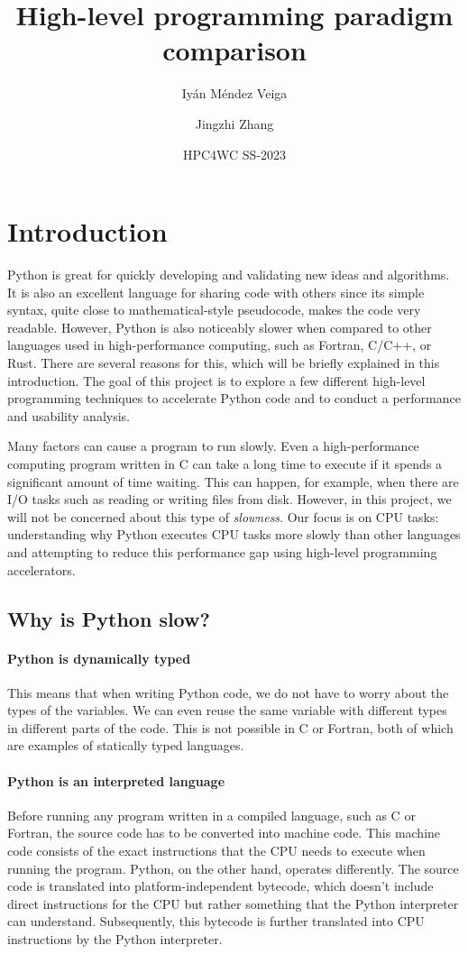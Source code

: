 \documentclass[12pt]{article}
\title{High-level programming paradigm comparison}
\author{Iyán Méndez Veiga \and Jingzhi Zhang}
\date{HPC4WC SS-2023}
\begin{document}
\maketitle
\tableofcontents

\section{Introduction}

Python is great for quickly developing and validating new ideas and algorithms. It is also an excellent language for sharing code with others since its simple syntax, quite close to mathematical-style pseudocode, makes the code very readable. However, Python is also noticeably slower when compared to other languages used in high-performance computing, such as Fortran, C/C++, or Rust. There are several reasons for this, which will be briefly explained in this introduction. The goal of this project is to explore a few different high-level programming techniques to accelerate Python code and to conduct a performance and usability analysis.

Many factors can cause a program to run slowly. Even a high-performance computing program written in C can take a long time to execute if it spends a significant amount of time waiting. This can happen, for example, when there are I/O tasks such as reading or writing files from disk. However, in this project, we will not be concerned about this type of \emph{slowness}. Our focus is on CPU tasks: understanding why Python executes CPU tasks more slowly than other languages and attempting to reduce this performance gap using high-level programming accelerators.

\subsection{Why is Python slow?}

\paragraph{Python is dynamically typed} This means that when writing Python code, we do not have to worry about the types of the variables. We can even reuse the same variable with different types in different parts of the code. This is not possible in C or Fortran, both of which are examples of statically typed languages.

\paragraph{Python is an interpreted language} Before running any program written in a compiled language, such as C or Fortran, the source code has to be converted into machine code. This machine code consists of the exact instructions that the CPU needs to execute when running the program. Python, on the other hand, operates differently. The source code is translated into platform-independent bytecode, which doesn't include direct instructions for the CPU but rather something that the Python interpreter can understand. Subsequently, this bytecode is further translated into CPU instructions by the Python interpreter.
\end{document}
